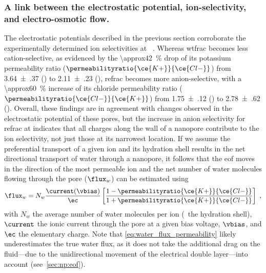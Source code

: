 \subsubsection{A link between the electrostatic potential, ion-selectivity, and electro-osmotic flow.}
%
%

The electrostatic potentials described in the previous section corroborate the experimentally determined ion
selectivities at ~\cite{Huang-2017}. Whereas \gls{wtfrac} becomes less cation-selective, as
evidenced by the \SI{\approx42}{\percent} drop of its potassium permeability ratio
($\permeabilityratio{\ce{K+}}{\ce{Cl-}}$) from \num{3.64(37)} () to \num{2.11(23)} (),
\gls{refrac} becomes more anion-selective, with a \SI{\approx60}{\percent} increase of its chloride
permeability ratio ($\permeabilityratio{\ce{Cl-}}{\ce{K+}}$) from \num{1.75(12)} () to \num{2.78(62)}
(). Overall, these findings are in agreement with changes observed in the electrostatic potential of
these pores, but the increase in anion selectivity for \gls{refrac} at  indicates that all charges
along the wall of a nanopore contribute to the ion selectivity, not just those at its narrowest location. If
we assume the preferential transport of a given ion and its hydration shell results in the net directional
transport of water through a nanopore, it follows that the \gls{eof} moves in the direction of the most
permeable ion and the net number of water molecules flowing through the pore ($\flux_{w}$) can be estimated
using~\cite{Piguet-2014}
%
\begin{equation}\label{eq:water_flux_permeability}
  \flux_{w} = N_{w} \dfrac{\current(\vbias)}{\ec} 
    \left[ \dfrac%
        {1 - \permeabilityratio{\ce{K+}}{\ce{Cl-}}}%
        {1 + \permeabilityratio{\ce{K+}}{\ce{Cl-}}}%
    \right]
    \text{ ,}
\end{equation}
%
with $N_{w}$ the average number of water molecules per ion (\ie~the hydration shell), $\current$ the ionic
current through the pore at a given bias voltage, $\vbias$, and $\ec$ the elementary charge. Note that
\cref{eq:water_flux_permeability} likely underestimates the true water flux, as it does not take the
additional drag on the fluid---due to the unidirectional movement of the electrical double layer---into
account (see~\cref{sec:np:eof}).

